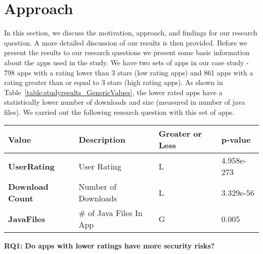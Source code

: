 \section{Approach}
\label{sec:Approach}



In this section, we discuss the motivation, approach, and findings for our research question. A more detailed discussion of our results is then provided. Before we present the results to our research questions we present some basic information about the apps used in the study. We have two sets of apps in our case study - 798 apps with a rating lower than 3 stars (low rating apps) and 861 apps with a rating greater than or equal to 3 stars (high rating apps). As shown in Table~\ref{table:studyresults_GenericValues}, the lower rated apps have a statistically lower number of downloads and size (measured in number of java files). We carried out the following research question with this set of apps.

\begin{table*}[t]
  \centering
  \caption{MWU Results for FileSize Settings}
     \begin{tabular}{ l | l | l | l }
		\bfseries Value & \bfseries Description & \bfseries Greater or Less & \bfseries p-value \\ \hline \hline

	\bfseries UserRating & User Rating & L &  4.958e-273   \\ \hline
	\bfseries Download Count  & Number of Downloads &L & 3.329e-56   \\ \hline
	\bfseries JavaFiles & \# of Java Files In App & G & 0.005\\ \hline

\end{tabular}
\label{table:studyresults_GenericValues}

\end{table*}

{\bf RQ1: Do apps with lower ratings have more security risks?}




